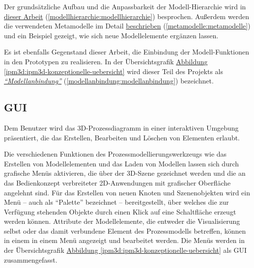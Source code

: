 \documentclass[a4paper,10pt]{sphinxmanual}
\begin{document}
Der grundsätzliche Aufbau und die Anpassbarkeit der Modell-Hierarchie wird in {\hyperref[modellhierarchie:modellhierarchie]{dieser Arbeit}} (\autoref*{modellhierarchie:modellhierarchie}) besprochen.
Außerdem werden die verwendeten Metamodelle im Detail {\hyperref[metamodelle:metamodelle]{beschrieben}} (\autoref*{metamodelle:metamodelle}) und ein Beispiel gezeigt, wie sich neue Modellelemente ergänzen lassen.

Es ist ebenfalls Gegenstand dieser Arbeit, die Einbindung der Modell-Funktionen in den Prototypen zu realisieren.
In der Übersichtsgrafik \hyperref[ipm3d:ipm3d-konzeptionelle-uebersicht]{Abbildung  \ref*{ipm3d:ipm3d-konzeptionelle-uebersicht}} wird dieser Teil des Projekts als {\hyperref[modellanbindung:modellanbindung]{\emph{"`Modellanbindung"'}}} (\autoref*{modellanbindung:modellanbindung}) bezeichnet.


\subsection{GUI}
\label{ipm3d:gui}\label{ipm3d:ipm3d-gui}
Dem Benutzer wird das 3D-Prozessdiagramm in einer interaktiven Umgebung präsentiert, die das Erstellen, Bearbeiten und Löschen von Elementen erlaubt.

Die verschiedenen Funktionen des Prozessmodellierungswerkzeugs wie das Erstellen von Modellelementen und das Laden von Modellen lassen sich durch grafische Menüs aktivieren, die über der 3D-Szene gezeichnet werden und die an das Bedienkonzept verbreiteter 2D-Anwendungen mit grafischer Oberfläche angelehnt sind.
Für das Erstellen von neuen Knoten und Szenenobjekten wird ein Menü – auch als "`Palette"' bezeichnet – bereitgestellt, über welches die zur Verfügung stehenden Objekte durch einen Klick auf eine Schaltfläche erzeugt werden können.
Attribute der Modellelemente, die entweder die Visualisierung selbst oder das damit verbundene Element des Prozessmodells betreffen, können in einem in einem Menü angezeigt und bearbeitet werden.
Die Menüs werden in der Übersichtsgrafik \hyperref[ipm3d:ipm3d-konzeptionelle-uebersicht]{Abbildung  \ref*{ipm3d:ipm3d-konzeptionelle-uebersicht}} als GUI zusammengefasst.
\end{document}
